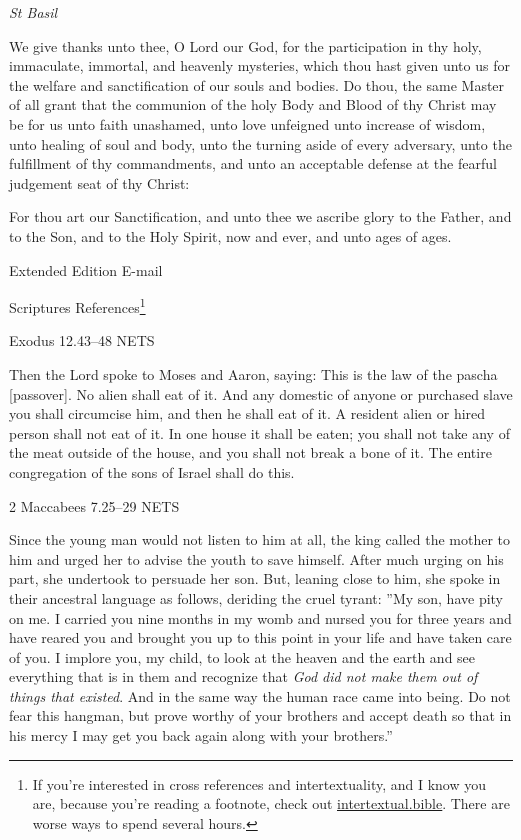 \documentclass[
]{article}
\newcommand{\RL}[1]{\beginR #1\endR}
\begin{document}
\emph{St Basil}

We give thanks unto thee, O Lord our God, for the participation in thy
holy, immaculate, immortal, and heavenly mysteries, which thou hast
given unto us for the welfare and sanctification of our souls and
bodies. Do thou, the same Master of all grant that the communion of the
holy Body and Blood of thy Christ may be for us unto faith unashamed,
unto love unfeigned unto increase of wisdom, unto healing of soul and
body, unto the turning aside of every adversary, unto the fulfillment of
thy commandments, and unto an acceptable defense at the fearful
judgement seat of thy Christ:

For thou art our Sanctification, and unto thee we ascribe glory to the
Father, and to the Son, and to the Holy Spirit, now and ever, and unto
ages of ages.

Extended Edition E-mail

Scriptures References\footnote{If you're interested in cross references
  and intertextuality, and I know you are, because you're reading a
  footnote, check out
  \href{http://intertextual.bible}{\ul{intertextual.bible}}. There are
  worse ways to spend several hours.}

Exodus 12.43--48 NETS

Then the Lord spoke to Moses and Aaron, saying: This is the law of the
pascha {[}passover{]}. No alien shall eat of it. And any domestic of
anyone or purchased slave you shall circumcise him, and then he shall
eat of it. A resident alien or hired person shall not eat of it. In one
house it shall be eaten; you shall not take any of the meat outside of
the house, and you shall not break a bone of it. The entire congregation
of the sons of Israel shall do this.

2 Maccabees 7.25--29 NETS

Since the young man would not listen to him at all, the king called the
mother to him and urged her to advise the youth to save himself. After
much urging on his part, she undertook to persuade her son. But, leaning
close to him, she spoke in their ancestral language as follows, deriding
the cruel tyrant: \RL{''}My son, have pity on me. I carried you nine
months in my womb and nursed you for three years and have reared you and
brought you up to this point in your life and have taken care of you. I
implore you, my child, to look at the heaven and the earth and see
everything that is in them and recognize that \emph{God did not make
them out of things that existed}. And in the same way the human race
came into being. Do not fear this hangman, but prove worthy of your
brothers and accept death so that in his mercy I may get you back again
along with your brothers.''
\end{document}
